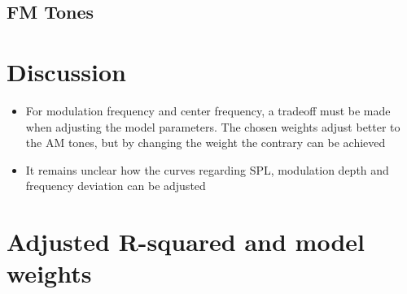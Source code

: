\documentclass{article}
\begin{document}
\subsection{FM Tones}
\label{subsec:results_fm_tones}

\clearpage

\section{Discussion}
\label{sec:discussion}

\begin{itemize}
  \item For modulation frequency and center frequency, a tradeoff must be made
  when adjusting the model parameters. The chosen weights adjust better to the
  AM tones, but by changing the weight the contrary can be achieved
  \item It remains unclear how the curves regarding SPL, modulation depth and
  frequency deviation can be adjusted
\end{itemize}

\mybibliography{}

\clearpage

\appendix

\section{Adjusted R-squared and model weights}

\end{document}
